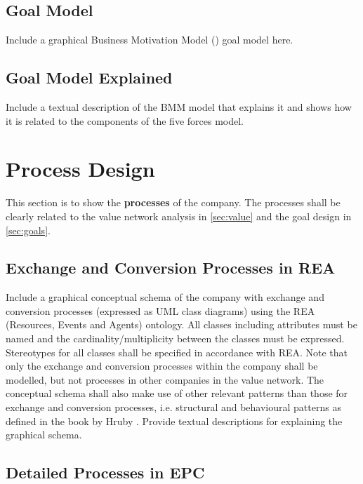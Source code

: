 \documentclass[12pt,a4paper]{article}
\begin{document}
\subsection{Goal Model}

Include a graphical Business Motivation Model (\cite{BusinessRulesGroup_BMM}) goal model here.

\subsection{Goal Model Explained}

Include a textual description of the BMM model that explains it and shows how it is related to the components of the five forces
model.

\section{Process Design} \label{sec:processes}

This section is to show the \textbf{processes} of the company.
The processes shall be clearly related to the value network analysis in \autoref{sec:value} and the goal design in
\autoref{sec:goals}.

\subsection{Exchange and Conversion Processes in REA}

Include a graphical conceptual schema of the company with exchange and conversion processes (expressed as UML class diagrams)
using the REA (Resources, Events and Agents) ontology.
All classes including attributes must be named and the cardinality/multiplicity between the classes must be expressed.
Stereotypes for all classes shall be specified in accordance with REA.
Note that only the exchange and conversion processes within the company shall be modelled, but not processes in other companies in
the value network.
The conceptual schema shall also make use of other relevant patterns than those for exchange and conversion processes, i.e.
structural and behavioural patterns as defined in the book by Hruby \cite{Hruby2006_BusinessPatterns}.
Provide textual descriptions for explaining the graphical schema.

\subsection{Detailed Processes in EPC}
\end{document}
